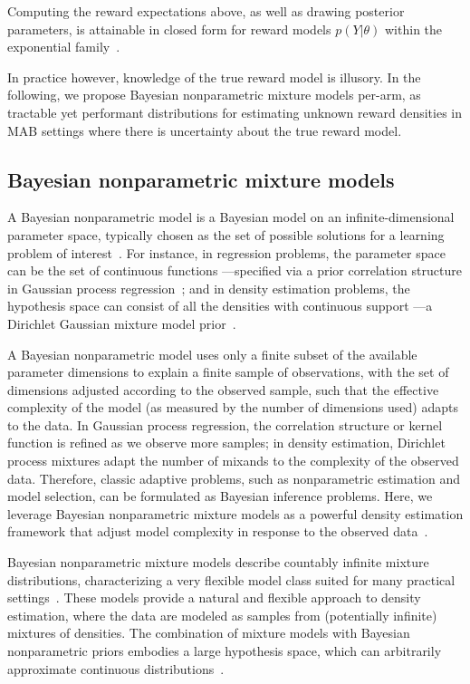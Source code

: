 Computing the reward expectations above, as well as drawing posterior parameters, is attainable in closed form for reward models $p(Y|\theta)$ within the exponential family~\citep{ic-Korda2013, j-Russo2018}.

In practice however, knowledge of the true reward model is illusory.
In the following, we propose Bayesian nonparametric mixture models per-arm, as tractable yet performant distributions for estimating unknown reward densities in MAB settings where there is uncertainty about the true reward model.

\subsection{Bayesian nonparametric mixture models}
\label{ssec:background_nonparametric_mixture_model}

A Bayesian nonparametric model is a Bayesian model on an infinite-dimensional parameter space, typically chosen as the set of possible solutions for a learning problem of interest~\citep{b-Mueller2015}.
For instance, in regression problems, the parameter space can be the set of continuous functions ---\eg specified via a prior correlation structure in Gaussian process regression~\citep{b-Rasmussen2005};
and in density estimation problems, the hypothesis space can consist of all the densities with continuous support ---\eg a Dirichlet Gaussian mixture model prior~\citep{j-Escobar1995}.

A Bayesian nonparametric model uses only a finite subset of the available parameter dimensions to explain a finite sample of observations, with the set of dimensions adjusted according to the observed sample, such that the effective complexity of the model (as measured by the number of dimensions used) adapts to the data.
In Gaussian process regression, the correlation structure or kernel function is refined as we observe more samples;
in density estimation, Dirichlet process mixtures adapt the number of mixands to the complexity of the observed data.
Therefore, classic adaptive problems, such as nonparametric estimation and model selection, can be formulated as Bayesian inference problems.
Here, we leverage Bayesian nonparametric mixture models as a powerful density estimation framework that adjust model complexity in response to the observed data~\citep{b-Ghosal2017}.

Bayesian nonparametric mixture models describe countably infinite mixture distributions, characterizing a very flexible model class suited for many practical settings~\citep{b-Ghosal2017}.
These models provide a natural and flexible approach to density estimation, where the data are modeled as samples from (potentially infinite) mixtures of densities.
The combination of mixture models with Bayesian nonparametric priors embodies a large hypothesis space, which can arbitrarily approximate continuous distributions~\citep{j-Ghosal1999, j-Ghosal2001, j-Lijoi2004, j-Ghosal2007}.

